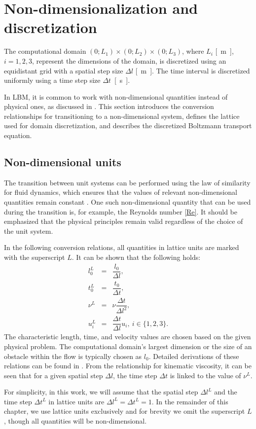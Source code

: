 \section{Non-dimensionalization and discretization}
The computational domain \( (0 ; L_1) \times(0 ; L_2) \times(0 ; L_3)\), where \( L_i\) \si{[m]}, $i=1,2,3$, represent the dimensions of the domain, is discretized using an equidistant grid with a spatial step size \( \Delta l \) \si{[m]}. The time interval is discretized uniformly using a time step size \( \Delta t \)~\si{[s]}.

In LBM, it is common to work with non-dimensional quantities instead of physical ones, as discussed in \cite{Kruger}. This section introduces the conversion relationships for transitioning to a non-dimensional system, defines the lattice used for domain discretization, and describes the discretized Boltzmann transport equation.

\subsection{Non-dimensional units}
The transition between unit systems can be performed using the law of similarity for fluid dynamics, which ensures that the values of relevant non-dimensional quantities remain constant \cite{Kruger}. One such non-dimensional quantity that can be used during the transition is, for example, the Reynolds number \eqref{Re}. It should be emphasized that the physical principles remain valid regardless of the choice of the unit system. 

In the following conversion relations, all quantities in lattice units are marked with the superscript \( L \). It can be shown \cite{Kruger} that the following holds:
\begin{eqnarray}
	l^{L}_0 &=& \dfrac{l_{0}}{\Delta l},\\[5pt]
	t^{L}_0 &=& \dfrac{t_{0}}{\Delta t},\\[5pt]
	\nu^L &=& \nu \dfrac{\Delta t}{\Delta l^{2}},\\[5pt]
	u^{L}_{i} &=& \dfrac{\Delta t}{\Delta l} u_{i}, \ i \in \{1, 2, 3\}.
\end{eqnarray}
The characteristic length, time, and velocity values are chosen based on the given physical problem. The computational domain's largest dimension or the size of an obstacle within the flow is typically chosen as \( l_{0} \). Detailed derivations of these relations can be found in \cite{Kruger}. From the relationship for kinematic viscosity, it can be seen that for a given spatial step \( \Delta l \), the time step \( \Delta t \) is linked to the value of \( \nu^L \).

For simplicity, in this work, we will assume that the spatial step \( \Delta l ^L \) and the time step \( \Delta t ^L \) in lattice units are \( \Delta l ^L  =  \Delta t ^L = 1 \). In the remainder of this chapter, we use lattice units exclusively and for brevity we omit the superscript \( L \), though all quantities will be non-dimensional.